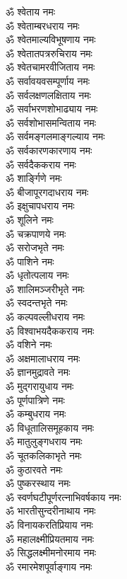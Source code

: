 \begin{multicols}{2}
\begin{flushleft}
ॐ श्वेताय नमः\hfill{}\\
ॐ श्वेताम्बरधराय नमः\\
ॐ श्वेतमाल्यविभूषणाय नमः\\
ॐ श्वेतातपत्ररुचिराय नमः\\
ॐ श्वेतचामरवीजिताय नमः\\
ॐ सर्वावयवसम्पूर्णाय नमः\\
ॐ सर्वलक्षणलक्षिताय नमः\\
ॐ सर्वाभरणशोभाढ्याय नमः\\
ॐ सर्वशोभासमन्विताय नमः\\
ॐ सर्वमङ्गलमाङ्गल्याय नमः\\
ॐ सर्वकारणकारणाय नमः\hfill{}\\
ॐ सर्वदैककराय नमः\\
ॐ शार्ङ्गिणे नमः\\
ॐ बीजापूरगदाधराय नमः\\
ॐ इक्षुचापधराय नमः\\
ॐ शूलिने नमः\\
ॐ चक्रपाणये नमः\\
ॐ सरोजभृते नमः\\
ॐ पाशिने नमः\\
ॐ धृतोत्पलाय नमः\\
ॐ शालिमञ्जरीभृते नमः\hfill{}\\
ॐ स्वदन्तभृते नमः\\
ॐ कल्पवल्लीधराय नमः\\
ॐ विश्वाभयदैककराय नमः\\
ॐ वशिने नमः\\
ॐ अक्षमालाधराय नमः\\
ॐ ज्ञानमुद्रावते नमः\\
ॐ मुद्गरायुधाय नमः\\
ॐ पूर्णपात्रिणे नमः\\
ॐ कम्बुधराय नमः\\
ॐ विधूतालिसमूहकाय नमः\hfill{}\\
ॐ मातुलुङ्गधराय नमः\\
ॐ चूतकलिकाभृते नमः\\
ॐ कुठारवते नमः\\
ॐ पुष्करस्थाय नमः\\
ॐ स्वर्णघटीपूर्णरत्नाभिवर्षकाय नमः\\
ॐ भारतीसुन्दरीनाथाय नमः\\
ॐ विनायकरतिप्रियाय नमः\\
ॐ महालक्ष्मीप्रियतमाय नमः\\
ॐ सिद्धलक्ष्मीमनोरमाय नमः\\
ॐ रमारमेशपूर्वाङ्गाय नमः\hfill{}\\

\end{flushleft}
\end{multicols}
